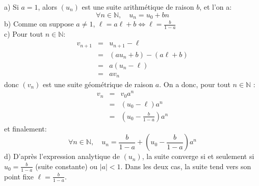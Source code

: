a) Si $a=1$, alors $(u_n)$ est une suite arithmétique de raison $b$, et l'on a:
\[
\forall n\in \mathbb{N}, \quad u_n=u_0+bn
\] 
b) Comme on suppose $a\neq 1$, $\ell=a\ell+b \Leftrightarrow \ell=\frac{b}{1-a}$\\
c) Pour tout $n\in\mathbb{N}$:
\begin{eqnarray*}
  v_{n+1} &=& u_{n+1}-\ell \\
    &=& (au_{n}+b)-(a\ell+b) \\
    &=& a(u_n-\ell) \\
    &=& av_n
\end{eqnarray*}
donc $(v_n)$ est une suite géométrique de raison $a$. On a donc, pour tout $n\in \mathbb{N}$ :
\begin{eqnarray*}
  v_n &=& v_0a^n \\
    &=& (u_0-\ell)a^n \\
    &=& \left( u_0 - \frac{b}{1-a} \right)a^n
\end{eqnarray*}
et finalement:
\[
\forall n\in \mathbb{N}, \quad u_n = \frac{b}{1-a} +\left( u_0 - \frac{b}{1-a} \right)a^n
\]
d) D’après l'expression analytique de $(u_n)$, la suite converge si et seulement si $u_0=\frac{b}{1-a}$ (suite constante) ou $|a|<1$. Dans les deux cas, la suite tend vers son point fixe $\ell = \frac{b}{1-a}$.
